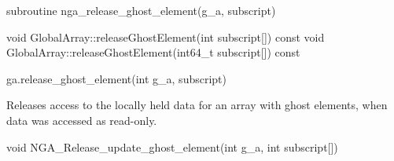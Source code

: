 \documentclass[10pt]{article}
\begin{document}
\begin{fapi}
\begin{fcode}
subroutine nga_release_ghost_element(g_a, subscript)
\end{fcode}
\begin{funcargs}
\end{funcargs}
\end{fapi}

\begin{cxxapi}
\begin{cxxcode}
void GlobalArray::releaseGhostElement(int subscript[]) const
void GlobalArray::releaseGhostElement(int64_t subscript[]) const
\end{cxxcode}
\begin{funcargs}
\end{funcargs}
\end{cxxapi}

\begin{pyapi}
\begin{pycode}
ga.release_ghost_element(int g_a, subscript)
\end{pycode}
\begin{funcargs}
\end{funcargs}
\end{pyapi}

\local

\begin{desc}

Releases access to the locally held data for an array with ghost elements, when
data was accessed as read-only.

\end{desc}



\begin{capi}
\begin{ccode}
void NGA_Release_update_ghost_element(int g_a, int subscript[])
\end{ccode}
\begin{funcargs}
\end{funcargs}
\end{capi}
\end{document}
